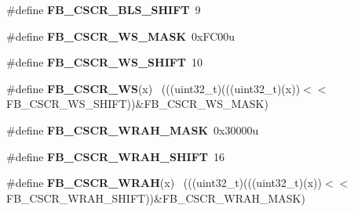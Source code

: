 \begin{DoxyCompactItemize}
\item 
\hypertarget{group___f_b___register___masks_gabbdaea319c238ce8fc0ba6d79e29b411}{}\#define {\bfseries F\+B\+\_\+\+C\+S\+C\+R\+\_\+\+B\+L\+S\+\_\+\+S\+H\+I\+F\+T}~9\label{group___f_b___register___masks_gabbdaea319c238ce8fc0ba6d79e29b411}

\item 
\hypertarget{group___f_b___register___masks_gaf6ddd3e9e267951e4af3886b8bf0c54e}{}\#define {\bfseries F\+B\+\_\+\+C\+S\+C\+R\+\_\+\+W\+S\+\_\+\+M\+A\+S\+K}~0x\+F\+C00u\label{group___f_b___register___masks_gaf6ddd3e9e267951e4af3886b8bf0c54e}

\item 
\hypertarget{group___f_b___register___masks_ga32c1c45a903fe04d1a3ffc5c2f95254f}{}\#define {\bfseries F\+B\+\_\+\+C\+S\+C\+R\+\_\+\+W\+S\+\_\+\+S\+H\+I\+F\+T}~10\label{group___f_b___register___masks_ga32c1c45a903fe04d1a3ffc5c2f95254f}

\item 
\hypertarget{group___f_b___register___masks_ga39872c273176e57b09afc1ed884262fa}{}\#define {\bfseries F\+B\+\_\+\+C\+S\+C\+R\+\_\+\+W\+S}(x)                                                    ~(((uint32\+\_\+t)(((uint32\+\_\+t)(x))$<$$<$F\+B\+\_\+\+C\+S\+C\+R\+\_\+\+W\+S\+\_\+\+S\+H\+I\+F\+T))\&F\+B\+\_\+\+C\+S\+C\+R\+\_\+\+W\+S\+\_\+\+M\+A\+S\+K)\label{group___f_b___register___masks_ga39872c273176e57b09afc1ed884262fa}

\item 
\hypertarget{group___f_b___register___masks_ga2843fc1784996e04d8a936a38da538af}{}\#define {\bfseries F\+B\+\_\+\+C\+S\+C\+R\+\_\+\+W\+R\+A\+H\+\_\+\+M\+A\+S\+K}~0x30000u\label{group___f_b___register___masks_ga2843fc1784996e04d8a936a38da538af}

\item 
\hypertarget{group___f_b___register___masks_gac68c032af50701cb3bbc1f1448b5ba2c}{}\#define {\bfseries F\+B\+\_\+\+C\+S\+C\+R\+\_\+\+W\+R\+A\+H\+\_\+\+S\+H\+I\+F\+T}~16\label{group___f_b___register___masks_gac68c032af50701cb3bbc1f1448b5ba2c}

\item 
\hypertarget{group___f_b___register___masks_ga0dfa9873f54b8766307423f0c5b31687}{}\#define {\bfseries F\+B\+\_\+\+C\+S\+C\+R\+\_\+\+W\+R\+A\+H}(x)                                                ~(((uint32\+\_\+t)(((uint32\+\_\+t)(x))$<$$<$F\+B\+\_\+\+C\+S\+C\+R\+\_\+\+W\+R\+A\+H\+\_\+\+S\+H\+I\+F\+T))\&F\+B\+\_\+\+C\+S\+C\+R\+\_\+\+W\+R\+A\+H\+\_\+\+M\+A\+S\+K)\label{group___f_b___register___masks_ga0dfa9873f54b8766307423f0c5b31687}


\end{DoxyCompactItemize}
